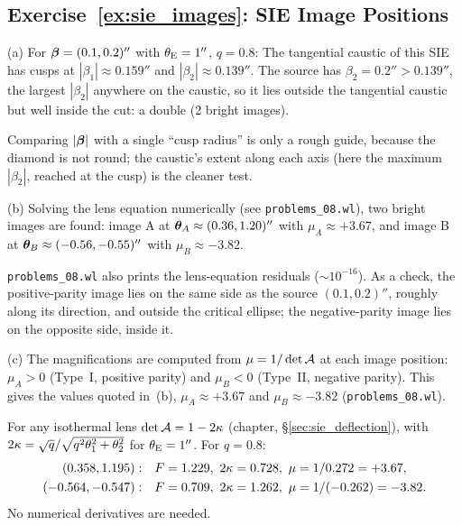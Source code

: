 \subsection*{Exercise~\ref{ex:sie_images}: SIE Image Positions}

(a) For $\boldsymbol{\beta} = (0.1, 0.2)''$ with $\theta_{\mathrm{E}} = 1''$,
$q = 0.8$: The tangential caustic of this SIE has cusps at
$|\beta_1| \approx 0.159''$ and $|\beta_2| \approx 0.139''$.  The
source has $\beta_2 = 0.2'' > 0.139''$, the largest $|\beta_2|$
anywhere on the caustic, so it lies outside the tangential caustic
but well inside the cut: a double (2 bright images).

\begin{annotation}
Comparing $|\boldsymbol{\beta}|$ with a single ``cusp radius'' is only a rough guide,
because the diamond is not round; the caustic's extent along each axis
(here the maximum $|\beta_2|$, reached at the cusp) is the cleaner test.
\end{annotation}


(b) Solving the lens equation numerically (see
\texttt{problems\_08.wl}), two bright images are found: image A at
$\boldsymbol{\theta}_A \approx (0.36, 1.20)''$ with $\mu_A \approx +3.67$, and
image B at $\boldsymbol{\theta}_B \approx (-0.56, -0.55)''$ with
$\mu_B \approx -3.82$.

\begin{annotation}
\texttt{problems\_08.wl} also prints the lens-equation residuals
($\sim10^{-16}$).  As a check, the positive-parity image lies on the same
side as the source $(0.1, 0.2)''$, roughly along its direction, and outside
the critical ellipse; the negative-parity image lies on the opposite side,
inside it.
\end{annotation}


(c) The magnifications are computed from
$\mu = 1/\det\mathcal{A}$ at each image position: $\mu_A > 0$ (Type~I,
positive parity) and $\mu_B < 0$ (Type~II, negative parity).  This
gives the values quoted in~(b), $\mu_A \approx +3.67$ and
$\mu_B \approx -3.82$ (\texttt{problems\_08.wl}).

\begin{derivation}[Magnifications by hand from $\mu = 1/(1-2\kappab)$]
For any isothermal lens $\det\mathcal{A} = 1-2\kappa$ (chapter,
\S\ref{sec:sie_deflection}), with $2\kappa = \sqrt{q}/\sqrt{q^2\theta_1^2+\theta_2^2}$
for $\theta_{\mathrm{E}} = 1''$.  For $q = 0.8$:
\begin{align*}
  (0.358, 1.195):&\quad F = 1.229,\ 2\kappa = 0.728,\ \mu = 1/0.272 = +3.67,\\
  (-0.564, -0.547):&\quad F = 0.709,\ 2\kappa = 1.262,\ \mu = 1/(-0.262) = -3.82 .
\end{align*}
No numerical derivatives are needed.
\end{derivation}


